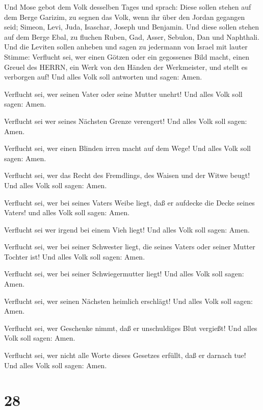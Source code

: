  Und Mose gebot dem Volk desselben Tages und sprach:
 Diese sollen stehen auf dem Berge Garizim, zu segnen das
Volk, wenn ihr über den Jordan gegangen seid; Simeon, Levi, Juda,
Isaschar, Joseph und Benjamin.  Und diese sollen stehen auf
dem Berge Ebal, zu fluchen Ruben, Gad, Asser, Sebulon, Dan und
Naphthali.  Und die Leviten sollen anheben und sagen zu
jedermann von Israel mit lauter Stimme:  Verflucht sei, wer
einen Götzen oder ein gegossenes Bild macht, einen Greuel des HERRN, ein
Werk von den Händen der Werkmeister, und stellt es verborgen auf! Und
alles Volk soll antworten und sagen: Amen.

 Verflucht sei, wer seinen Vater oder seine Mutter unehrt!
Und alles Volk soll sagen: Amen.

 Verflucht sei wer seines Nächsten Grenze verengert! Und
alles Volk soll sagen: Amen.

 Verflucht sei, wer einen Blinden irren macht auf dem Wege!
Und alles Volk soll sagen: Amen.

 Verflucht sei, wer das Recht des Fremdlings, des Waisen
und der Witwe beugt! Und alles Volk soll sagen: Amen.

 Verflucht sei, wer bei seines Vaters Weibe liegt, daß er
aufdecke die Decke seines Vaters! und alles Volk soll sagen: Amen.

 Verflucht sei wer irgend bei einem Vieh liegt! Und alles
Volk soll sagen: Amen.

 Verflucht sei, wer bei seiner Schwester liegt, die seines
Vaters oder seiner Mutter Tochter ist! Und alles Volk soll sagen: Amen.

 Verflucht sei, wer bei seiner Schwiegermutter liegt! Und
alles Volk soll sagen: Amen.

 Verflucht sei, wer seinen Nächsten heimlich erschlägt! Und
alles Volk soll sagen: Amen.

 Verflucht sei, wer Geschenke nimmt, daß er unschuldiges
Blut vergießt! Und alles Volk soll sagen: Amen.

 Verflucht sei, wer nicht alle Worte dieses Gesetzes
erfüllt, daß er darnach tue! Und alles Volk soll sagen: Amen.

\hypertarget{section-27}{%
\section{28}\label{section-27}}

